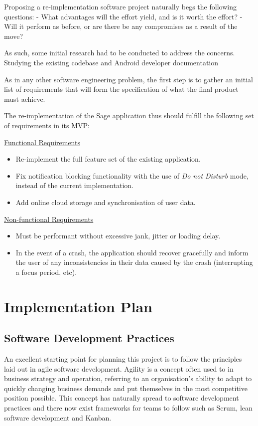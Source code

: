 Proposing a re-implementation software project naturally begs the following questions:
- What advantages will the effort yield, and is it worth the effort?
- Will it perform as before, or are there be any compromises as a result of the move?

As such, some initial research had to be conducted to address the concerns.
Studying the existing codebase and Android developer documentation

As in any other software engineering problem, the first step is to gather an initial list of requirements that will form the specification of what the final product must achieve.

The re-implementation of the Sage application thus should fulfill the following set of requirements in its MVP:

\underline{Functional Requirements}
\begin{itemize}
    \item Re-implement the full feature set of the existing application.
    \item Fix notification blocking functionality with the use of \textit{Do not Disturb} mode, instead of the current implementation.
    \item Add online cloud storage and synchronisation of user data.
\end{itemize}

\underline{Non-functional Requirements}
\begin{itemize}
    \item Must be performant without excessive jank, jitter or loading delay.
    \item In the event of a crash, the application should recover gracefully and inform the user of any inconsistencies in their data caused by the crash (interrupting a focus period, etc).
\end{itemize}


\section{Implementation Plan}
\subsection{Software Development Practices}
An excellent starting point for planning this project is to follow the principles laid out in agile software development. Agility is a concept often used to in business strategy and operation, referring to an organisation's ability to adapt to quickly changing business demands and put themselves in the most competitive position possible. This concept has naturally spread to software development practices and there now exist frameworks for teams to follow such as Scrum, lean software development and Kanban.

